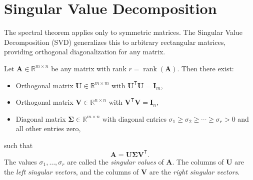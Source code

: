 \section{Singular Value Decomposition}

The spectral theorem applies only to symmetric matrices. The Singular Value Decomposition (SVD) generalizes this to arbitrary rectangular matrices, providing orthogonal diagonalization for any matrix.

\begin{theorem}\label{thm:svd}
  Let $\mathbf{A} \in \mathbb{R}^{m \times n}$ be any matrix with rank $r = \operatorname{rank}(\mathbf{A})$. Then there exist:
  \begin{itemize}
    \item Orthogonal matrix $\mathbf{U} \in \mathbb{R}^{m \times m}$ with $\mathbf{U}^{\mathsf{T}}\mathbf{U} = \mathbf{I}_m$,
    \item Orthogonal matrix $\mathbf{V} \in \mathbb{R}^{n \times n}$ with $\mathbf{V}^{\mathsf{T}}\mathbf{V} = \mathbf{I}_n$,
    \item Diagonal matrix $\mathbf{\Sigma} \in \mathbb{R}^{m \times n}$ with diagonal entries $\sigma_1 \geq \sigma_2 \geq \cdots \geq \sigma_r > 0$ and all other entries zero,
  \end{itemize}
  such that
  \begin{equation}\label{eq:svd}
    \mathbf{A} = \mathbf{U}\mathbf{\Sigma}\mathbf{V}^{\mathsf{T}}.
  \end{equation}
  The values $\sigma_1,\dots,\sigma_r$ are called the \emph{singular values} of $\mathbf{A}$. The columns of $\mathbf{U}$ are the \emph{left singular vectors}, and the columns of $\mathbf{V}$ are the \emph{right singular vectors}.
\end{theorem}

